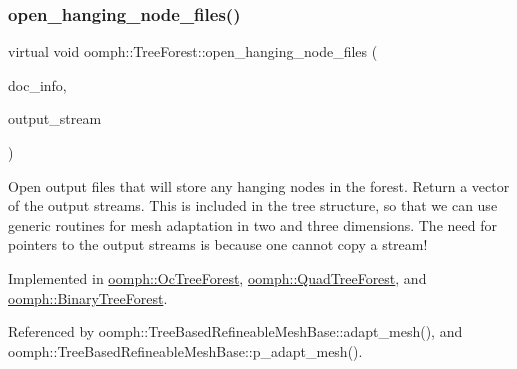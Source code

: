 \mbox{\label{classoomph_1_1TreeForest_a384793832d8ab83e23636597e5fe1e1a}} 
\subsubsection{\texorpdfstring{open\+\_\+hanging\+\_\+node\+\_\+files()}{open\_hanging\_node\_files()}}
{\footnotesize\ttfamily virtual void oomph\+::\+Tree\+Forest\+::open\+\_\+hanging\+\_\+node\+\_\+files (\begin{DoxyParamCaption}\item[{\hyperlink{classoomph_1_1DocInfo}{Doc\+Info} \&}]{doc\+\_\+info,  }\item[{\hyperlink{classoomph_1_1Vector}{Vector}$<$ std\+::ofstream $\ast$$>$ \&}]{output\+\_\+stream }\end{DoxyParamCaption})\hspace{0.3cm}{\ttfamily [pure virtual]}}



Open output files that will store any hanging nodes in the forest. Return a vector of the output streams. This is included in the tree structure, so that we can use generic routines for mesh adaptation in two and three dimensions. The need for pointers to the output streams is because one cannot copy a stream! 



Implemented in \hyperlink{classoomph_1_1OcTreeForest_a6d8d84745819ea3ed42a76d7e1fac3a5}{oomph\+::\+Oc\+Tree\+Forest}, \hyperlink{classoomph_1_1QuadTreeForest_a42c02805b4a2307def88d07e5a7c8266}{oomph\+::\+Quad\+Tree\+Forest}, and \hyperlink{classoomph_1_1BinaryTreeForest_a3567e04e401c5abc64dff4280e93d592}{oomph\+::\+Binary\+Tree\+Forest}.



Referenced by oomph\+::\+Tree\+Based\+Refineable\+Mesh\+Base\+::adapt\+\_\+mesh(), and oomph\+::\+Tree\+Based\+Refineable\+Mesh\+Base\+::p\+\_\+adapt\+\_\+mesh().

\mbox{\label{classoomph_1_1TreeForest_a518492c6567cd08a8fc3812bcdc9d348}} 
